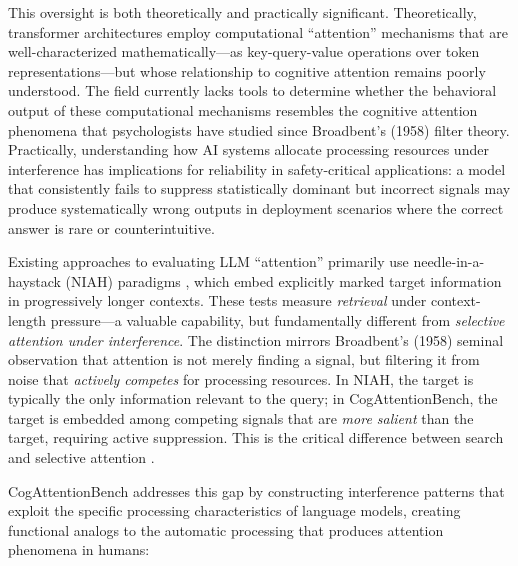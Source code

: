 \documentclass{article}
\begin{document}
This oversight is both theoretically and practically significant. Theoretically, transformer architectures employ computational ``attention'' mechanisms \citep{vaswani2017} that are well-characterized mathematically---as key-query-value operations over token representations---but whose relationship to cognitive attention remains poorly understood. The field currently lacks tools to determine whether the behavioral output of these computational mechanisms resembles the cognitive attention phenomena that psychologists have studied since Broadbent's (1958) filter theory. Practically, understanding how AI systems allocate processing resources under interference has implications for reliability in safety-critical applications: a model that consistently fails to suppress statistically dominant but incorrect signals may produce systematically wrong outputs in deployment scenarios where the correct answer is rare or counterintuitive.

Existing approaches to evaluating LLM ``attention'' primarily use needle-in-a-haystack (NIAH) paradigms \citep{kamradt2023,li2024,hsieh2024}, which embed explicitly marked target information in progressively longer contexts. These tests measure \emph{retrieval} under context-length pressure---a valuable capability, but fundamentally different from \emph{selective attention under interference}. The distinction mirrors Broadbent's (1958) seminal observation that attention is not merely finding a signal, but filtering it from noise that \emph{actively competes} for processing resources. In NIAH, the target is typically the only information relevant to the query; in CogAttentionBench, the target is embedded among competing signals that are \emph{more salient} than the target, requiring active suppression. This is the critical difference between search and selective attention \citep{treisman1980}.

CogAttentionBench addresses this gap by constructing interference patterns that exploit the specific processing characteristics of language models, creating functional analogs to the automatic processing that produces attention phenomena in humans:
\end{document}
